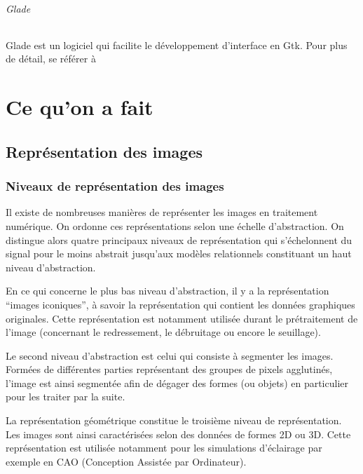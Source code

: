 \documentclass[]{report}
\begin{document}
			\paragraph{Glade} %
				Glade est un logiciel qui facilite le d\'eveloppement d'interface en Gtk. Pour plus de d\'etail, se r\'ef\'erer \`a %
			\label{par:glade}





\part{Ce qu'on a fait} %
\label{prt:ce_qu_on_a_fait}


  \chapter{Repr\'esentation des images} %
	\label{cha:repr'esentation_des_images}


    \section{Niveaux de repr\'esentation des images} %
    \label{sec:niveaux_de_repr'esentation_des_images}
  		Il existe de nombreuses manières de représenter les images en traitement numérique. On ordonne ces représentations selon une échelle d'abstraction. On distingue alors quatre principaux niveaux de représentation qui s'échelonnent du signal pour le moins abstrait jusqu'aux modèles relationnels constituant un haut niveau d'abstraction.

      En ce qui concerne le plus bas niveau d'abstraction, il y a la représentation ``images iconiques'', à savoir la représentation qui contient les données graphiques originales. Cette représentation est notamment utilisée durant le prétraitement de l'image (concernant le redressement, le débruitage ou encore le seuillage).

      Le second niveau d'abstraction est celui qui consiste à segmenter les images. Formées de différentes parties représentant des groupes de pixels agglutinés, l'image est ainsi segmentée afin de dégager des formes (ou objets) en particulier pour les traiter par la suite.

      La représentation géométrique constitue le troisième niveau de représentation. Les images sont ainsi caractérisées selon des données de formes 2D ou 3D. Cette représentation est utilisée notamment pour les simulations d'éclairage par exemple en CAO (Conception Assistée par Ordinateur).
\end{document}
